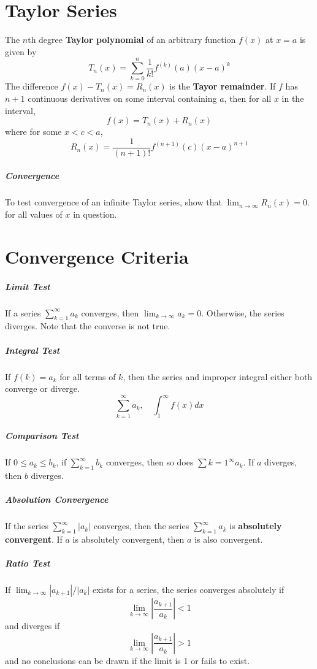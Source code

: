 \documentclass[11pt]{article}
\begin{document}
\section{Taylor Series}
	The $n$th degree \textbf{Taylor polynomial} of an arbitrary function $f(x)$ at $x=a$ is given by
	\begin{equation}
		T_n(x) = \sum_{k=0}^n \frac{1}{k!}f^{(k)}(a)(x-a)^k
	\end{equation}
	The difference $f(x) - T_n(x) = R_n(x)$ is the \textbf{Tayor remainder}. If $f$ has $n+1$ continuous derivatives on some interval containing $a$, then for all $x$ in the interval,
	\begin{equation}
		f(x) = T_n(x) + R_n(x)
	\end{equation}
	where for some $x < c < a$,
	\begin{equation}
		R_n(x) = \frac{1}{(n+1)!}f^{(n+1)}(c)(x-a)^{n+1}
	\end{equation}
	
	\subparagraph{Convergence} To test convergence of an infinite Taylor series, show that $\lim_{n\rightarrow \infty} R_n(x) = 0$. for all values of $x$ in question.
	
\section{Convergence Criteria}
	\subparagraph{Limit Test} If a series $\sum_{k=1}^\infty a_k$ converges, then $\lim_{k\rightarrow \infty} a_k = 0$. Otherwise, the series diverges. Note that the converse is not true.
	
	\subparagraph{Integral Test} If $f(k) = a_k$ for all terms of $k$, then the series and improper integral either both converge or diverge.
	\begin{equation}
		\sum_{k=1}^\infty a_k, \quad \int_1^\infty f(x)dx
	\end{equation}
	
	\subparagraph{Comparison Test} If $0 \leq a_k \leq b_k$, if $\sum_{k=1}^\infty b_k$ converges, then so does $\sum{k=1}^\infty a_k$. If $a$ diverges, then $b$ diverges.
	
	\subparagraph{Absolution Convergence} If the series $\sum_{k=1}^\infty |a_k|$ converges, then the series $\sum_{k=1}^\infty a_k$ is \textbf{absolutely convergent}. If $a$ is absolutely convergent, then $a$ is also convergent.
	
	\subparagraph{Ratio Test} If $\lim_{k\rightarrow \infty} |a_{k+1}|/|a_k|$ exists for a series, the series converges absolutely if
	\begin{equation}
		\lim_{k\rightarrow \infty} \left| \frac{a_{k+1}}{a_k} \right| < 1
	\end{equation}
	and diverges if
	\begin{equation}
		\lim_{k\rightarrow \infty} \left| \frac{a_{k+1}}{a_k} \right| > 1
	\end{equation}
	and no conclusions can be drawn if the limit is 1 or fails to exist.
	
\end{document}
